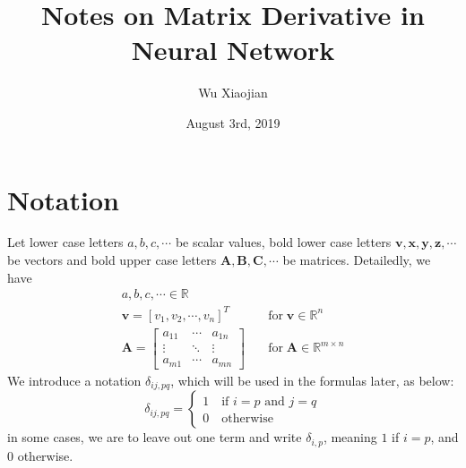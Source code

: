 \documentclass{article}
\author{Wu Xiaojian}
\title{Notes on Matrix Derivative in Neural Network}
\date{August 3rd, 2019}
\begin{document}
\maketitle
\section{Notation}
Let lower case letters $a,b,c,\cdots$ be scalar values, bold lower case letters $\boldsymbol{v},\boldsymbol{x},\boldsymbol{y},\boldsymbol{z},\cdots$ be vectors and bold upper case letters $\boldsymbol{A},\boldsymbol{B},\boldsymbol{C},\cdots$ be matrices. Detailedly, we have
\begin{align*}
    a,b,c,\cdots \in \mathbb{R}&\\
    \boldsymbol{v}=[v_1,v_2,\cdots,v_n]^T &\quad \text{for}\; \boldsymbol{v}\in\mathbb{R}^n\\
    \boldsymbol{A}=\begin{bmatrix}
        a_{11}&\cdots&a_{1n}\\
        \vdots&\ddots&\vdots\\
        a_{m1}&\cdots&a_{mn}
    \end{bmatrix}&\quad \text{for}\; \boldsymbol{A}\in\mathbb{R}^{m\times n}
\end{align*} 
We introduce a notation $\delta_{ij,pq}$,  which will be used in the formulas later, as below:
\begin{equation*}
    \delta_{ij,pq}=\begin{cases}
        1\quad\text{if $i=p$ and $j=q$}\\
        0\quad\text{otherwise}
    \end{cases}
\end{equation*}
in some cases, we are to leave out one term and write $\delta_{i,p}$, meaning $1$ if $i=p$, and $0$ otherwise.
\end{document}
